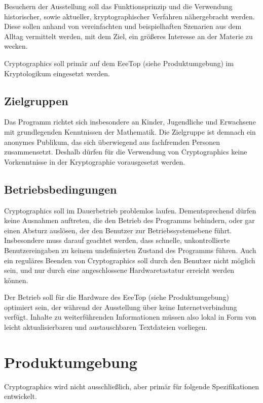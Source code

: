 \documentclass{article}
\begin{document}
Besuchern der Ausstellung soll das Funktionsprinzip und die Verwendung historischer, sowie aktueller, kryptographischer Verfahren nähergebracht werden. Diese sollen anhand von vereinfachten und beispielhaften Szenarien aus dem Alltag vermittelt werden, mit dem Ziel, ein größeres Interesse an der Materie zu wecken.

\gls{Cryptographics} soll primär auf dem \gls{EeeTop} (siehe Produktumgebung) im \gls{Kryptologikum} eingesetzt werden.

\subsection{Zielgruppen}

Das Programm richtet sich insbesondere an Kinder, Jugendliche und Erwachsene mit grundlegenden Kenntnissen der Mathematik. Die Zielgruppe ist demnach ein anonymes Publikum, das sich überwiegend aus fachfremden Personen zusammensetzt. Deshalb dürfen für die Verwendung von \gls{Cryptographics} keine Vorkenntnisse in der Kryptographie vorausgesetzt werden.

\subsection{Betriebsbedingungen}

\gls{Cryptographics} soll im Dauerbetrieb problemlos laufen. Dementsprechend dürfen keine Ausnahmen auftreten, die den Betrieb des Programms behindern, oder gar einen Absturz auslösen, der den Benutzer zur Betriebssystemebene führt. Insbesondere muss darauf geachtet werden, dass schnelle, unkontrollierte Benutzereingaben zu keinem undefinierten Zustand des Programms führen. Auch ein reguläres Beenden von \gls{Cryptographics} soll durch den Benutzer nicht möglich sein, und nur durch eine angeschlossene Hardwaretastatur erreicht werden können.

Der Betrieb soll für die Hardware des \gls{EeeTop} (siehe Produktumgebung) optimiert sein, der während der Ausstellung über keine Internetverbindung verfügt. Inhalte zu weiterführenden Informationen müssen also lokal in Form von leicht aktualisierbaren und austauschbaren Textdateien vorliegen.

\section{Produktumgebung}

\gls{Cryptographics} wird nicht ausschließlich, aber primär für folgende Spezifikationen entwickelt.
\end{document}
